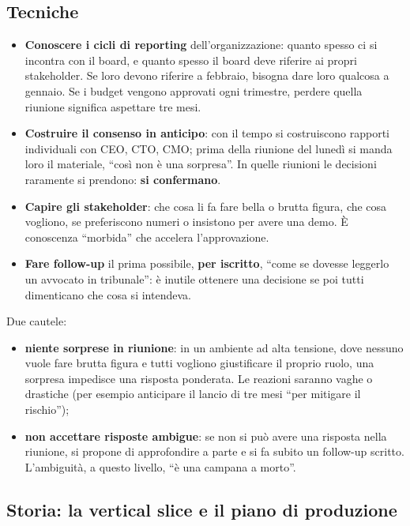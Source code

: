 \subsection{Tecniche}

\begin{itemize}
  \item \textbf{Conoscere i cicli di reporting} dell'organizzazione: quanto spesso
        ci si incontra con il board, e quanto spesso il board deve riferire ai
        propri stakeholder. Se loro devono riferire a febbraio, bisogna dare loro
        qualcosa a gennaio. Se i budget vengono approvati ogni trimestre, perdere
        quella riunione significa aspettare tre mesi.
  \item \textbf{Costruire il consenso in anticipo}: con il tempo si costruiscono
        rapporti individuali con CEO, CTO, CMO; prima della riunione del lunedì si
        manda loro il materiale, ``così non è una sorpresa''. In quelle riunioni le
        decisioni raramente si prendono: \textbf{si confermano}.
  \item \textbf{Capire gli stakeholder}: che cosa li fa fare bella o brutta figura,
        che cosa vogliono, se preferiscono numeri o insistono per avere una demo.
        È conoscenza ``morbida'' che accelera l'approvazione.
  \item \textbf{Fare follow-up} il prima possibile, \textbf{per iscritto}, ``come
        se dovesse leggerlo un avvocato in tribunale'': è inutile ottenere una
        decisione se poi tutti dimenticano che cosa si intendeva.
\end{itemize}
Due cautele:
\begin{itemize}
  \item \textbf{niente sorprese in riunione}: in un ambiente ad alta tensione, dove
        nessuno vuole fare brutta figura e tutti vogliono giustificare il proprio
        ruolo, una sorpresa impedisce una risposta ponderata. Le reazioni saranno
        vaghe o drastiche (per esempio anticipare il lancio di tre mesi ``per
        mitigare il rischio'');
  \item \textbf{non accettare risposte ambigue}: se non si può avere una risposta
        nella riunione, si propone di approfondire a parte e si fa subito un
        follow-up scritto. L'ambiguità, a questo livello, ``è una campana a
        morto''.
\end{itemize}

\subsection{Storia: la vertical slice e il piano di produzione}


